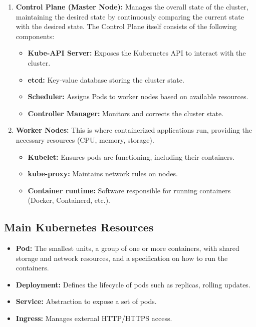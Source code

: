 \begin{enumerate}
    \item \textbf{Control Plane (Master Node):} Manages the overall state of the cluster, maintaining the desired state by continuously comparing the current state with the desired state. The Control Plane itself consists of the following components:
    \begin{itemize}
        \item \textbf{Kube-API Server:} Exposes the Kubernetes API to interact with the cluster.
        \item \textbf{etcd:} Key-value database storing the cluster state.
        \item \textbf{Scheduler:} Assigns Pods to worker nodes based on available resources.
        \item \textbf{Controller Manager:} Monitors and corrects the cluster state.
    \end{itemize}

    \item \textbf{Worker Nodes:} This is where containerized applications run, providing the necessary resources (CPU, memory, storage).
    \begin{itemize}
        \item \textbf{Kubelet:} Ensures pods are functioning, including their containers.
        \item \textbf{kube-proxy:} Maintains network rules on nodes.
        \item \textbf{Container runtime:} Software responsible for running containers (Docker, Containerd, etc.).
    \end{itemize}
\end{enumerate}

\subsection{Main Kubernetes Resources}
\label{subsec:k8s-resources}

\begin{itemize}
    \item \textbf{Pod:} The smallest units, a group of one or more containers, with shared storage and network resources, and a specification on how to run the containers.
    \item \textbf{Deployment:} Defines the lifecycle of pods such as replicas, rolling updates.
    \item \textbf{Service:} Abstraction to expose a set of pods.
    \item \textbf{Ingress:} Manages external HTTP/HTTPS access.
\end{itemize}

